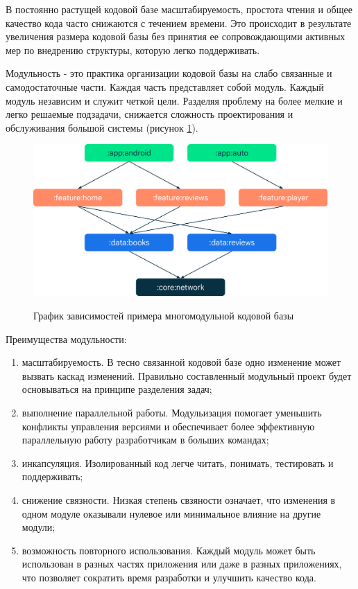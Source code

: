 В постоянно растущей кодовой базе масштабируемость, простота чтения и общее качество кода часто снижаются с течением времени. Это происходит в результате увеличения размера кодовой базы без принятия ее сопровождающими активных мер по внедрению структуры, которую легко поддерживать. 

Модульность - это практика организации кодовой базы на слабо связанные и самодостаточные части. Каждая часть представляет собой модуль. Каждый модуль независим и служит четкой цели. Разделяя проблему на более мелкие и легко решаемые подзадачи, снижается сложность проектирования и обслуживания большой системы (рисунок \ref{fig:modul_graph}).

\begin{figure}[h!]
    \begin{center}
        \includegraphics[width=0.95\hsize]{fig/modul_graph.png}\\[2mm]

        \caption{График зависимостей примера многомодульной кодовой базы}\label{fig:modul_graph}
    \end{center}
\end{figure}

Преимущества модульности:

\begin{enumerate}
    \item масштабируемость. В тесно связанной кодовой базе одно изменение может вызвать каскад изменений. Правильно составленный модульный проект будет основываться на принципе разделения задач;
    \item выполнение параллельной работы. Модульизация помогает уменьшить конфликты управления версиями и обеспечивает более эффективную параллельную работу разработчикам в больших командах;
    \item инкапсуляция. Изолированный код легче читать, понимать, тестировать и поддерживать;
    \item снижение связности. Низкая степень свзяности означает, что изменения в одном модуле оказывали нулевое или минимальное влияние на другие модули;
    \item возможность повторного использования. Каждый модуль может быть использован в разных частях приложения или даже в разных приложениях, что позволяет сократить время разработки и улучшить качество кода.
\end{enumerate}



